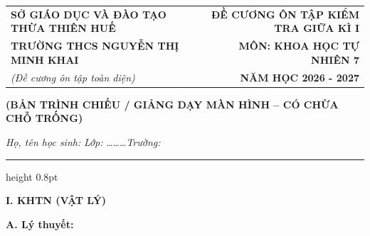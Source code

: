 \documentclass[13pt,a4paper]{article}
\begin{document}
\begin{tabularx}{\textwidth}{@{}l X r@{}}
\textbf{\small SỞ GIÁO DỤC VÀ ĐÀO TẠO THỪA THIÊN HUẾ} & & \textbf{\small ĐỀ CƯƠNG ÔN TẬP KIỂM TRA GIỮA KÌ I} \\
\textbf{\normalsize TRƯỜNG THCS NGUYỄN THỊ MINH KHAI} & & \textbf{\normalsize MÔN: KHOA HỌC TỰ NHIÊN 7} \\
\textit{\small (Đề cương ôn tập toàn diện)} & & \textbf{\small NĂM HỌC 2026 - 2027}
\end{tabularx}

\begin{center}
{\color{purple!80!black}\textbf{(BẢN TRÌNH CHIẾU / GIẢNG DẠY MÀN HÌNH -- CÓ CHỪA CHỖ TRỐNG)}}\par\vspace{3pt}
\textit{Họ, tên học sinh:} \dotfill \quad \textit{Lớp:} \dots\dots\dots \quad \textit{Trường:} \dotfill
\end{center}
\vspace{-4pt}
{\color{gray!50}\hrule height 0.8pt}
\vspace{8pt}

{\color{myGreen}\large\bfseries I. KHTN (VẬT LÝ)}

\vspace{3pt}
{\color{mySub}\textbf{A. Lý thuyết:}}
\end{document}
